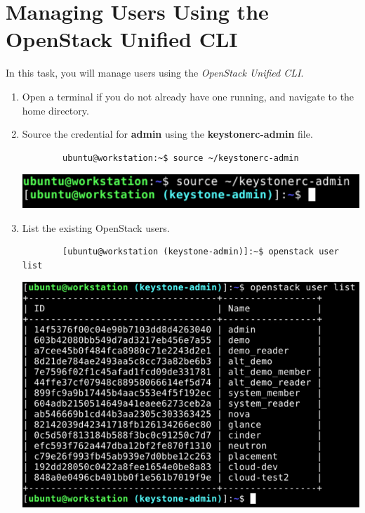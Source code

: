 \documentclass[letterpaper, 12pt]{article}
\begin{document}
\section{Managing Users Using the OpenStack Unified CLI}
\label{sec:managing_users_using_the_openstack_unified_cli}
In this task, you will manage users using the \textit{OpenStack Unified CLI}.

\begin{enumerate}
    \item Open a terminal if you do not already have one running, and navigate to the home directory.
    
    \item Source the credential for \textbf{admin} using the \textbf{keystonerc-admin} file.
    \begin{lstlisting}
        ubuntu@workstation:~$ source ~/keystonerc-admin
    \end{lstlisting}

    \begin{center}
        \includegraphics[width=\linewidth]{images/part4/step2.png}
    \end{center}

    \item List the existing OpenStack users.
    \begin{lstlisting}
        [ubuntu@workstation (keystone-admin)]:~$ openstack user list
    \end{lstlisting}

    \begin{center}
        \includegraphics[width=\linewidth]{images/part4/step3.png}
    \end{center}


\end{enumerate}
\end{document}
